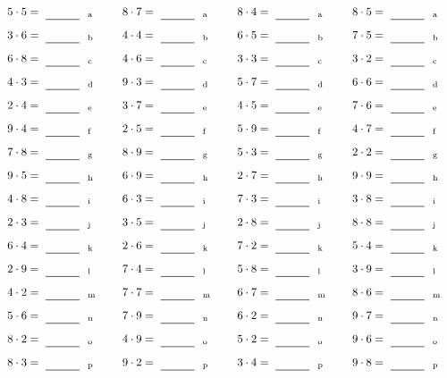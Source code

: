 \documentclass
[
  draft    = true,
  fontsize = 11pt,
  parskip  = half-
]
{scrartcl}
\begin{document}
\par\vfill\par
\begin{align*}
    \pline{5\cdot5}&=\rline{a}
  & \pline{8\cdot7}&=\rline{a}
  & \pline{8\cdot4}&=\rline{a}
  & \pline{8\cdot5}&=\rline{a} \\[1ex]
    \pline{3\cdot6}&=\rline{b}
  & \pline{4\cdot4}&=\rline{b}
  & \pline{6\cdot5}&=\rline{b}
  & \pline{7\cdot5}&=\rline{b} \\[1ex]
    \pline{6\cdot8}&=\rline{c}
  & \pline{4\cdot6}&=\rline{c}
  & \pline{3\cdot3}&=\rline{c}
  & \pline{3\cdot2}&=\rline{c} \\[1ex]
    \pline{4\cdot3}&=\rline{d}
  & \pline{9\cdot3}&=\rline{d}
  & \pline{5\cdot7}&=\rline{d}
  & \pline{6\cdot6}&=\rline{d} \\[1ex]
    \pline{2\cdot4}&=\rline{e}
  & \pline{3\cdot7}&=\rline{e}
  & \pline{4\cdot5}&=\rline{e}
  & \pline{7\cdot6}&=\rline{e} \\[1ex]
    \pline{9\cdot4}&=\rline{f}
  & \pline{2\cdot5}&=\rline{f}
  & \pline{5\cdot9}&=\rline{f}
  & \pline{4\cdot7}&=\rline{f} \\[1ex]
    \pline{7\cdot8}&=\rline{g}
  & \pline{8\cdot9}&=\rline{g}
  & \pline{5\cdot3}&=\rline{g}
  & \pline{2\cdot2}&=\rline{g} \\[1ex]
    \pline{9\cdot5}&=\rline{h}
  & \pline{6\cdot9}&=\rline{h}
  & \pline{2\cdot7}&=\rline{h}
  & \pline{9\cdot9}&=\rline{h} \\[1ex]
    \pline{4\cdot8}&=\rline{i}
  & \pline{6\cdot3}&=\rline{i}
  & \pline{7\cdot3}&=\rline{i}
  & \pline{3\cdot8}&=\rline{i} \\[1ex]
    \pline{2\cdot3}&=\rline{j}
  & \pline{3\cdot5}&=\rline{j}
  & \pline{2\cdot8}&=\rline{j}
  & \pline{8\cdot8}&=\rline{j} \\[1ex]
    \pline{6\cdot4}&=\rline{k}
  & \pline{2\cdot6}&=\rline{k}
  & \pline{7\cdot2}&=\rline{k}
  & \pline{5\cdot4}&=\rline{k} \\[1ex]
    \pline{2\cdot9}&=\rline{l}
  & \pline{7\cdot4}&=\rline{l}
  & \pline{5\cdot8}&=\rline{l}
  & \pline{3\cdot9}&=\rline{l} \\[1ex]
    \pline{4\cdot2}&=\rline{m}
  & \pline{7\cdot7}&=\rline{m}
  & \pline{6\cdot7}&=\rline{m}
  & \pline{8\cdot6}&=\rline{m} \\[1ex]
    \pline{5\cdot6}&=\rline{n}
  & \pline{7\cdot9}&=\rline{n}
  & \pline{6\cdot2}&=\rline{n}
  & \pline{9\cdot7}&=\rline{n} \\[1ex]
    \pline{8\cdot2}&=\rline{o}
  & \pline{4\cdot9}&=\rline{o}
  & \pline{5\cdot2}&=\rline{o}
  & \pline{9\cdot6}&=\rline{o} \\[1ex]
    \pline{8\cdot3}&=\rline{p}
  & \pline{9\cdot2}&=\rline{p}
  & \pline{3\cdot4}&=\rline{p}
  & \pline{9\cdot8}&=\rline{p}
\end{align*}
\end{document}
